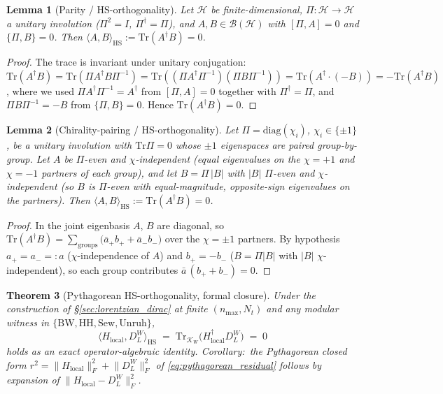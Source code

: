 \documentclass[11pt,a4paper]{article}
\theoremstyle{plain}
\newtheorem{theorem}{Theorem}[section]
\newtheorem{lemma}[theorem]{Lemma}
\theoremstyle{definition}
\newcommand{\nmax}{n_{\max}}
\newcommand{\Nt}{N_t}
\newcommand{\Frob}[1]{\lVert #1 \rVert_{F}}
\newcommand{\Tr}{\mathrm{Tr}}
\newcommand{\DL}{D_{L}}
\begin{document}
\begin{lemma}[Parity / HS-orthogonality]\label{lem:parity_HS}
Let $\mathcal{H}$ be finite-dimensional, $\Pi : \mathcal{H} \to
\mathcal{H}$ a unitary involution ($\Pi^{2} = I$,
$\Pi^{\dagger} = \Pi$), and $A, B \in \mathcal{B}(\mathcal{H})$
with $[\Pi, A] = 0$ and $\{\Pi, B\} = 0$. Then
$\langle A, B \rangle_{\mathrm{HS}} := \Tr(A^{\dagger} B) = 0$.
\end{lemma}

\begin{proof}
The trace is invariant under unitary conjugation:\
$\Tr(A^{\dagger} B) = \Tr(\Pi A^{\dagger} B \Pi^{-1}) =
\Tr((\Pi A^{\dagger} \Pi^{-1})(\Pi B \Pi^{-1}))
= \Tr(A^{\dagger} \cdot (-B)) = -\Tr(A^{\dagger} B)$,
where we used $\Pi A^{\dagger} \Pi^{-1} = A^{\dagger}$ from
$[\Pi, A] = 0$ together with $\Pi^{\dagger} = \Pi$, and
$\Pi B \Pi^{-1} = -B$ from $\{\Pi, B\} = 0$. Hence
$\Tr(A^{\dagger} B) = 0$.
\end{proof}

\begin{lemma}[Chirality-pairing / HS-orthogonality]\label{lem:pairing_HS}
Let $\Pi = \mathrm{diag}(\chi_{i})$, $\chi_{i} \in \{\pm1\}$, be a unitary
involution with $\Tr\Pi = 0$ whose $\pm1$ eigenspaces are paired
group-by-group. Let $A$ be $\Pi$-even and \emph{$\chi$-independent}
(equal eigenvalues on the $\chi = +1$ and $\chi = -1$ partners of each
group), and let $B = \Pi\,|B|$ with $|B|$ $\Pi$-even and $\chi$-independent
(so $B$ is $\Pi$-even with equal-magnitude, opposite-sign eigenvalues on
the partners). Then
$\langle A, B\rangle_{\mathrm{HS}} := \Tr(A^{\dagger}B) = 0$.
\end{lemma}

\begin{proof}
In the joint eigenbasis $A$, $B$ are diagonal, so
$\Tr(A^{\dagger}B) = \sum_{\mathrm{groups}}
\big(\bar a_{+}b_{+} + \bar a_{-}b_{-}\big)$ over the $\chi = \pm1$
partners. By hypothesis $a_{+} = a_{-} =: a$ ($\chi$-independence of $A$)
and $b_{+} = -b_{-}$ ($B = \Pi|B|$ with $|B|$ $\chi$-independent), so each
group contributes $\bar a\,(b_{+} + b_{-}) = 0$.
\end{proof}

\begin{theorem}[Pythagorean HS-orthogonality, formal closure]
\label{thm:pythagorean_formal}
Under the construction of \S\ref{sec:lorentzian_dirac} at finite
$(\nmax, \Nt)$ and any modular witness in
$\{\mathrm{BW}, \mathrm{HH}, \mathrm{Sew}, \mathrm{Unruh}\}$,
$$
\big\langle H_{\mathrm{local}}, \DL^{W} \big\rangle_{\mathrm{HS}}
\;=\; \Tr_{\mathcal{K}_{W}}\!\big(H_{\mathrm{local}}^{\dagger}
\DL^{W}\big) \;=\; 0
$$
holds as an exact operator-algebraic identity. Corollary:\ the
Pythagorean closed form $r^{2} =
\Frob{H_{\mathrm{local}}}^{2} + \Frob{\DL^{W}}^{2}$ of
\eqref{eq:pythagorean_residual} follows by expansion of
$\Frob{H_{\mathrm{local}} - \DL^{W}}^{2}$.
\end{theorem}
\end{document}

